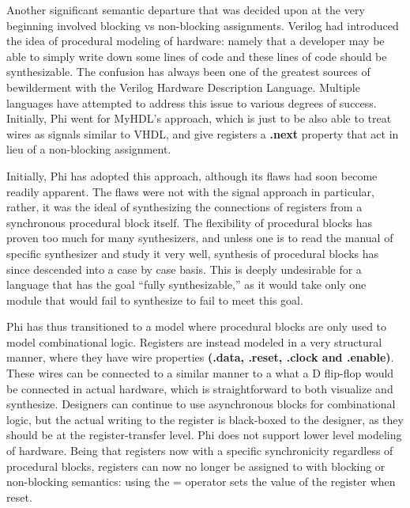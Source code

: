 \documentclass[10pt, two column]{article}
\theoremstyle{definition}
\begin{document}
Another significant semantic departure that was decided upon at the very beginning involved blocking vs non-blocking assignments. Verilog had introduced the idea of procedural modeling of hardware: namely that a developer may be able to simply write down some lines of code and these lines of code should be synthesizable. The confusion has always been one of the greatest sources of bewilderment with the Verilog Hardware Description Language. Multiple languages have attempted to address this issue to various degrees of success. Initially, Phi went for MyHDL’s approach, which is just to be also able to treat wires as signals similar to VHDL, and give registers a \textbf{.next} property that act in lieu of a non-blocking assignment.\newline

Initially, Phi has adopted this approach, although its flaws had soon become readily apparent. The flaws were not with the signal approach in particular, rather, it was the ideal of synthesizing the connections of registers from a synchronous procedural block itself. The flexibility of procedural blocks has proven too much for many synthesizers, and unless one is to read the manual of specific synthesizer and study it very well, synthesis of procedural blocks has since descended into a case by case basis. This is deeply undesirable for a language that has the goal “fully synthesizable,” as it would take only one module that would fail to synthesize to fail to meet this goal.\newline

Phi has thus transitioned to a model where procedural blocks are only used to model combinational logic. Registers are instead modeled in a very structural manner, where they have wire properties \textbf{(.data, .reset, .clock and .enable)}. These wires can be connected to a similar manner to a what a D flip-flop would be connected in actual hardware, which is straightforward to both visualize and synthesize. Designers can continue to use asynchronous blocks for combinational logic, but the actual writing to the register is black-boxed to the designer, as they should be at the register-transfer level. Phi does not support lower level modeling of hardware. Being that registers now with a specific synchronicity regardless of procedural blocks, registers can now no longer be assigned to with blocking or non-blocking semantics: using the = operator sets the value of the register when reset.\newline
\end{document}
